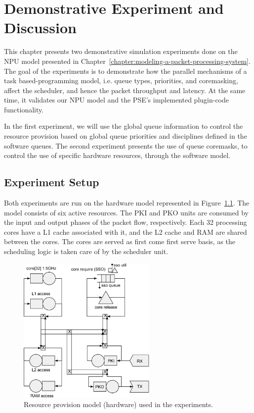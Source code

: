 \chapter{Demonstrative Experiment and Discussion}
\label{chapter:demonstrative-experiments}

This chapter presents two demonstrative simulation experiments done on the NPU model presented in Chapter~\ref{chapter:modeling-a-packet-processing-system}. The goal of the experiments is to demonstrate how the parallel mechanisms of a task based-programming model, i.e. queue types, priorities, and coremasking, affect the scheduler, and hence the packet throughput and latency. At the same time, it validates our NPU model and the PSE's implemented plugin-code functionality.

In the first experiment, we will use the global queue information to control the resource provision based on global queue priorities and disciplines defined in the software queues. The second experiment presents the use of queue coremasks, to control the use of specific hardware resources, through the software model.

\section{Experiment Setup}
\label{sec:experiment-setup}

Both experiments are run on the hardware model represented in Figure~\ref{fig:experiment-hardware}. The model consists of six active resources. The PKI and PKO units are consumed by the input and output phases of the packet flow, respectively. Each 32 processing cores have a L1 cache associated with it, and the L2 cache and RAM are shared between the cores. The cores are served as first come first serve basis, as the scheduling logic is taken care of by the scheduler unit.

\begin{figure}[]
  \begin{center}
    \includegraphics[width=0.6\textwidth]{images/pse-models/experiment-hardware.pdf}
    \caption{Resource provision model (hardware) used in the experiments.}
    \label{fig:experiment-hardware}
  \end{center}
\end{figure}

